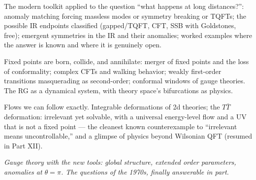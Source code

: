 The modern toolkit applied to the question ``what happens at long distances?'': anomaly matching forcing massless modes or symmetry breaking or TQFTs; the possible IR endpoints classified (gapped/TQFT, CFT, SSB with Goldstones, free); emergent symmetries in the IR and their anomalies; worked examples where the answer is known and where it is genuinely open.

Fixed points are born, collide, and annihilate: merger of fixed points and the loss of conformality; complex CFTs and walking behavior; weakly first-order transitions masquerading as second-order; conformal windows of gauge theories. The RG as a dynamical system, with theory space's bifurcations as physics.

Flows we can follow exactly. Integrable deformations of 2d theories; the $T\bar{T}$ deformation: irrelevant yet solvable, with a universal energy-level flow and a UV that is not a fixed point --- the cleanest known counterexample to ``irrelevant means uncontrollable,'' and a glimpse of physics beyond Wilsonian QFT (resumed in Part XII).


\noin \emph{Gauge theory with the new tools: global structure, extended order parameters, anomalies at $\theta=\pi$. The questions of the 1970s, finally answerable in part.}

